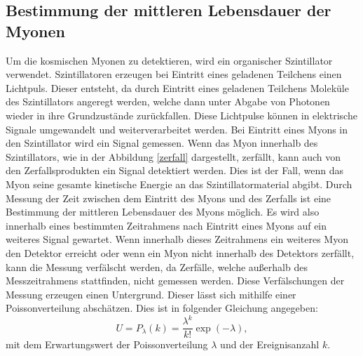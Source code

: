 \subsection{Bestimmung der mittleren Lebensdauer der Myonen}
\label{subsec:BestimmungLebensdauer}
Um die kosmischen Myonen zu detektieren, wird ein organischer Szintillator verwendet.
Szintillatoren erzeugen bei Eintritt eines geladenen Teilchens einen Lichtpuls.
Dieser entsteht, da durch Eintritt eines geladenen Teilchens Moleküle des Szintillators
angeregt werden, welche dann unter Abgabe von Photonen wieder in ihre Grundzustände zurückfallen.
Diese Lichtpulse können in elektrische Signale umgewandelt und weiterverarbeitet werden.
Bei Eintritt eines Myons in den Szintillator wird ein Signal gemessen. Wenn das Myon innerhalb
des Szintillators, wie in der Abbildung \ref{zerfall} dargestellt, zerfällt, kann auch von den Zerfallsprodukten
ein Signal detektiert werden. Dies ist der Fall, wenn das Myon seine gesamte kinetische Energie
an das Szintillatormaterial abgibt.
Durch Messung der Zeit zwischen dem Eintritt des Myons und des
Zerfalls ist eine Bestimmung der mittleren Lebensdauer des Myons möglich. Es wird also
innerhalb eines bestimmten Zeitrahmens nach Eintritt eines Myons auf ein weiteres Signal
gewartet. Wenn innerhalb dieses Zeitrahmens ein weiteres Myon den Detektor erreicht oder wenn
ein Myon nicht innerhalb des Detektors zerfällt, kann die Messung verfälscht werden, da
Zerfälle, welche außerhalb des Messzeitrahmens stattfinden, nicht gemessen werden.
Diese Verfälschungen der Messung erzeugen einen Untergrund. Dieser lässt sich mithilfe
einer Poissonverteilung abschätzen. Dies ist in folgender Gleichung angegeben:
\begin{equation}
  U = P_{\lambda} (k) = \frac{\lambda^{k}}{k!} \exp{(-\lambda)},
  \label{eqn:Untergrundrate}
\end{equation}
\noindent
mit dem Erwartungswert der Poissonverteilung $\lambda$ und der Ereignisanzahl $k$.
